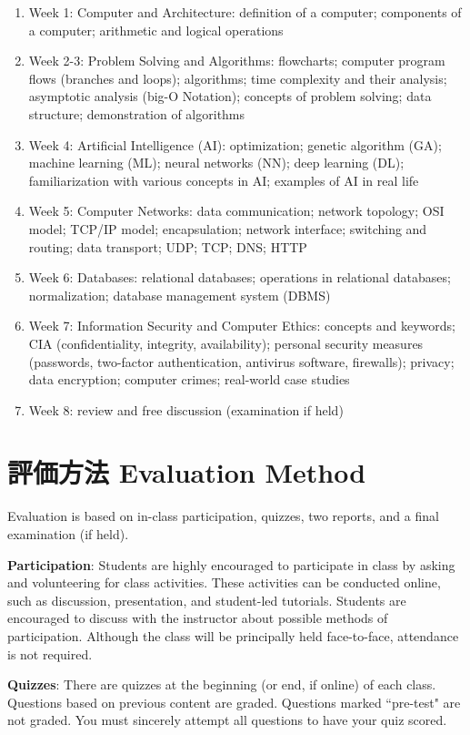 \documentclass[a4paper]{article}
\begin{document}
\begin{enumerate}
    \item Week 1: Computer and Architecture: definition of a computer; components of a computer; arithmetic and logical operations
    \item Week 2-3: Problem Solving and Algorithms: flowcharts; computer program flows (branches and loops); algorithms; time complexity and their analysis; asymptotic analysis (big-O Notation); concepts of problem solving; data structure; demonstration of algorithms
    \item Week 4: Artificial Intelligence (AI): optimization; genetic algorithm (GA); machine learning (ML); neural networks (NN); deep learning (DL); familiarization with various concepts in AI; examples of AI in real life
    \item Week 5: Computer Networks: data communication; network topology; OSI model; TCP/IP model; encapsulation; network interface; switching and routing; data transport; UDP; TCP; DNS; HTTP
    \item Week 6: Databases: relational databases; operations in relational databases; normalization; database management system (DBMS)
    \item Week 7: Information Security and Computer Ethics: concepts and keywords; CIA (confidentiality, integrity, availability); personal security measures (passwords, two-factor authentication, antivirus software, firewalls); privacy; data encryption; computer crimes; real-world case studies
    \item Week 8: review and free discussion (examination if held)
\end{enumerate}

\section{評価方法 Evaluation Method}
Evaluation is based on in-class participation, quizzes, two reports, and a final examination (if held).

\smallskip\noindent
\textbf{Participation}: Students are highly encouraged to participate in class by asking and volunteering for class activities. These activities can be conducted online, such as discussion, presentation, and student-led tutorials. Students are encouraged to discuss with the instructor about possible methods of participation. Although the class will be principally held face-to-face, attendance is not required.

\smallskip\noindent
\textbf{Quizzes}: There are quizzes at the beginning (or end, if online) of each class. Questions based on previous content are graded. Questions marked ``pre-test" are not graded. You must sincerely attempt all questions to have your quiz scored.
\end{document}
